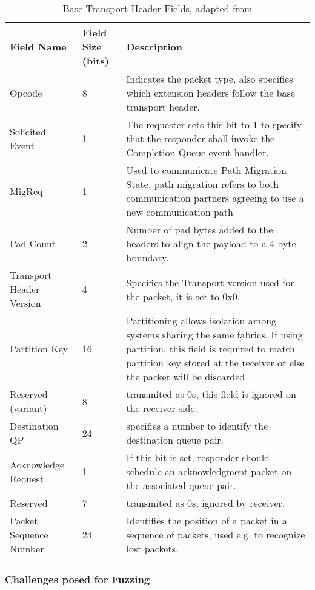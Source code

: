 \begin{table}[h]
  \begin{tabular}{| m{10em} | m{3em} | m{15em} |}
    \hline
    Field Name &  Field Size (bits) & Description\\
    \hline
    Opcode & 8 & Indicates the packet type, also specifies which extension headers follow the base transport header.\\
    \hline
    Solicited Event & 1 &  The requester sets this bit to 1 to specify that the responder shall invoke the Completion Queue event handler.\\
    \hline
    MigReq & 1 &  Used to communicate Path Migration State, path migration refers to both communication partners agreeing to use a new communication path\\
    \hline
    Pad Count & 2 &  Number of pad bytes added to the headers to align the payload to a 4 byte boundary.\\
    \hline
    Transport Header Version & 4 &  Specifies the Transport version used for the packet, it is set to 0x0.\\
    \hline
    Partition Key & 16 &  Partitioning allows isolation among systems sharing the same fabrics. If using partition, this field is required to match partition key stored at the receiver or else the packet will be discarded\\
    \hline
    Reserved (variant) & 8 &  transmited as 0s, this field is ignored on the receiver side.\\
    \hline
    Destination QP & 24 &  specifies a number to identify the destination queue pair.\\
    \hline
    Acknowledge Request & 1 &  If this bit is set, responder should schedule an acknowledgment packet on the associated queue pair.\\
    \hline
    Reserved & 7 &  transmited as 0s, ignored by receiver. \\
    \hline
    Packet Sequence Number & 24 &  Identifies the position of a packet in a sequence of packets, used e.g. to recognize lost packets.\\
    \hline
  \end{tabular}
  \caption[Base Transport Header Fields]{Base Transport Header Fields, adapted from\cite{infinibandvol107}}
  \label{tab:bthfields}
\end{table}

\subsubsection{Challenges posed for Fuzzing}\label{s:ibverbs-challenges}

